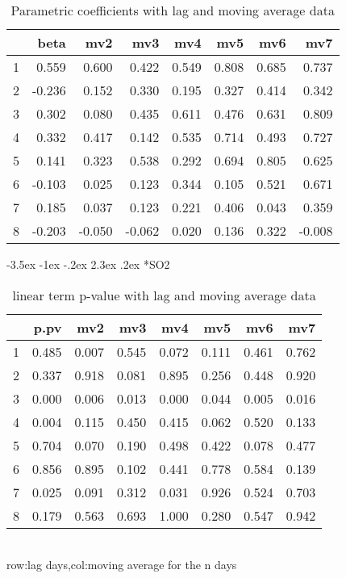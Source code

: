\documentclass[a4paper, 12pt]{article}
\makeatletter
\def\large{\fontsize{14}{20}\selectfont}
\renewcommand\subsection{\@startsection {subsection}{1}{\z@}%
                                   {-3.5ex \@plus -1ex \@minus -.2ex}%
                                   {2.3ex \@plus.2ex}%
                                   {\centering\normalfont\large\bfseries}}
\makeatother
\begin{document}
\begin{table}[h]
\centering
\caption{Parametric coefficients with lag and moving average data}
\begin{tabular}{rrrrrrrr}
  \hline
 & beta & mv2 & mv3 & mv4 & mv5 & mv6 & mv7 \\
  \hline
1 & 0.559 & 0.600 & 0.422 & 0.549 & 0.808 & 0.685 & 0.737 \\
  2 & -0.236 & 0.152 & 0.330 & 0.195 & 0.327 & 0.414 & 0.342 \\
  3 & 0.302 & 0.080 & 0.435 & 0.611 & 0.476 & 0.631 & 0.809 \\
  4 & 0.332 & 0.417 & 0.142 & 0.535 & 0.714 & 0.493 & 0.727 \\
  5 & 0.141 & 0.323 & 0.538 & 0.292 & 0.694 & 0.805 & 0.625 \\
  6 & -0.103 & 0.025 & 0.123 & 0.344 & 0.105 & 0.521 & 0.671 \\
  7 & 0.185 & 0.037 & 0.123 & 0.221 & 0.406 & 0.043 & 0.359 \\
  8 & -0.203 & -0.050 & -0.062 & 0.020 & 0.136 & 0.322 & -0.008 \\
   \hline
\end{tabular}
\end{table}
\clearpage
\subsection*{SO2}
\begin{table}[h]
\centering
\caption{linear term p-value with lag and moving average data}
\begin{tabular}{rrrrrrrr}
  \hline
 & p.pv & mv2 & mv3 & mv4 & mv5 & mv6 & mv7 \\
  \hline
1 & 0.485 & 0.007 & 0.545 & 0.072 & 0.111 & 0.461 & 0.762 \\
  2 & 0.337 & 0.918 & 0.081 & 0.895 & 0.256 & 0.448 & 0.920 \\
  3 & 0.000 & 0.006 & 0.013 & 0.000 & 0.044 & 0.005 & 0.016 \\
  4 & 0.004 & 0.115 & 0.450 & 0.415 & 0.062 & 0.520 & 0.133 \\
  5 & 0.704 & 0.070 & 0.190 & 0.498 & 0.422 & 0.078 & 0.477 \\
  6 & 0.856 & 0.895 & 0.102 & 0.441 & 0.778 & 0.584 & 0.139 \\
  7 & 0.025 & 0.091 & 0.312 & 0.031 & 0.926 & 0.524 & 0.703 \\
  8 & 0.179 & 0.563 & 0.693 & 1.000 & 0.280 & 0.547 & 0.942 \\
   \hline
\end{tabular}
\\row:lag days,col:moving average for the n days
\end{table}
\end{document}
